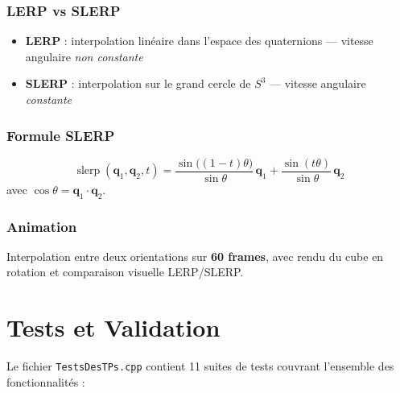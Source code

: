 \documentclass[11pt,a4paper]{article}
\begin{document}
\subsubsection{LERP vs SLERP}

\begin{itemize}[itemsep=3pt]
    \item \textbf{LERP} : interpolation linéaire dans l'espace des quaternions — vitesse angulaire \textit{non constante}
    \item \textbf{SLERP} : interpolation sur le grand cercle de $S^3$ — vitesse angulaire \textit{constante}
\end{itemize}

\subsubsection{Formule SLERP}

\[
\operatorname{slerp}(\mathbf{q}_1, \mathbf{q}_2, t) = \frac{\sin\!\bigl((1-t)\theta\bigr)}{\sin\theta}\,\mathbf{q}_1 + \frac{\sin(t\theta)}{\sin\theta}\,\mathbf{q}_2
\]
avec $\cos\theta = \mathbf{q}_1 \cdot \mathbf{q}_2$.

\subsubsection{Animation}

Interpolation entre deux orientations sur \textbf{60 frames}, avec rendu du cube en rotation et comparaison visuelle LERP/SLERP.

\newpage

\section{Tests et Validation}

Le fichier \texttt{TestsDesTPs.cpp} contient 11 suites de tests couvrant l'ensemble des fonctionnalités :
\end{document}
